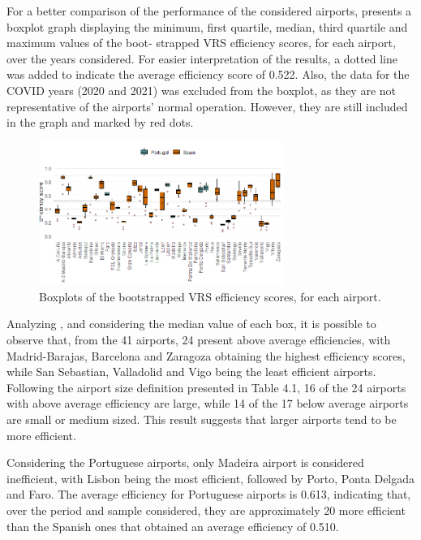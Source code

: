 For a better comparison of the performance of the considered airports,  presents a boxplot  
graph displaying the minimum, first quartile, median, third quartile and maximum values of the boot-
strapped VRS efficiency scores, for each airport, over the years considered. For easier interpretation of
the results, a dotted line was added to indicate the average efficiency score of 0.522. Also, the data for
the COVID years (2020 and 2021) was excluded from the boxplot, as they are not representative of the
airports’ normal operation. However, they are still included in the graph and marked by red dots.
  \vspace{-0.4cm}

\begin{figure}[h!]
  \centering
  \includegraphics[width=8cm]{images/Rplot01.png}
  \vspace{-0.8cm}
  \caption{Boxplots of the bootstrapped VRS efficiency scores, for each airport.}
  \label{fig:boxplot}
\end{figure}
  \vspace{-0.3cm}

Analyzing , and considering the median value of each box, it is possible to observe
that, from the 41 airports, 24 present above average efficiencies, with Madrid-Barajas, Barcelona and
Zaragoza obtaining the highest efficiency scores, while San Sebastian, Valladolid and Vigo being the
least efficient airports. Following the airport size definition presented in Table 4.1, 16 of the 24 airports
with above average efficiency are large, while 14 of the 17 below average airports are small or medium
sized. This result suggests that larger airports tend to be more efficient. 

Considering the Portuguese airports, only Madeira airport is considered inefficient, with Lisbon being
the most efficient, followed by Porto, Ponta Delgada and Faro. The average efficiency for Portuguese
airports is 0.613, indicating that, over the period and sample considered, they are approximately 20 %
more efficient than the Spanish ones that obtained an average efficiency of 0.510.




